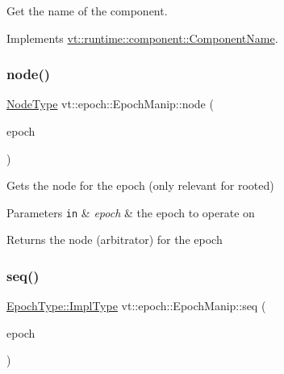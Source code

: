 Get the name of the component. 



Implements \hyperlink{structvt_1_1runtime_1_1component_1_1_component_name_a33c06229bb605a2b2ceff68830d6d773}{vt\+::runtime\+::component\+::\+Component\+Name}.

\mbox{\label{structvt_1_1epoch_1_1_epoch_manip_a7120f73ef583ab8f061334fc0bc519c3}} 
\subsubsection{\texorpdfstring{node()}{node()}}
{\footnotesize\ttfamily \hyperlink{namespacevt_a866da9d0efc19c0a1ce79e9e492f47e2}{Node\+Type} vt\+::epoch\+::\+Epoch\+Manip\+::node (\begin{DoxyParamCaption}\item[{\hyperlink{structvt_1_1epoch_1_1_epoch_type}{Epoch\+Type} const \&}]{epoch }\end{DoxyParamCaption})\hspace{0.3cm}{\ttfamily [static]}}



Gets the node for the epoch (only relevant for rooted) 


\begin{DoxyParams}[1]{Parameters}
\mbox{\tt in}  & {\em epoch} & the epoch to operate on\\
\hline
\end{DoxyParams}
\begin{DoxyReturn}{Returns}
the node (arbitrator) for the {\ttfamily epoch} 
\end{DoxyReturn}
\mbox{\label{structvt_1_1epoch_1_1_epoch_manip_a0205c8fbd8bafaf35c0102a061c0d09f}} 
\subsubsection{\texorpdfstring{seq()}{seq()}}
{\footnotesize\ttfamily \hyperlink{structvt_1_1epoch_1_1_epoch_type_aef70d29ac80a421e67bc15ffbe9b9e70}{Epoch\+Type\+::\+Impl\+Type} vt\+::epoch\+::\+Epoch\+Manip\+::seq (\begin{DoxyParamCaption}\item[{\hyperlink{structvt_1_1epoch_1_1_epoch_type}{Epoch\+Type} const \&}]{epoch }\end{DoxyParamCaption})\hspace{0.3cm}{\ttfamily [static]}}



